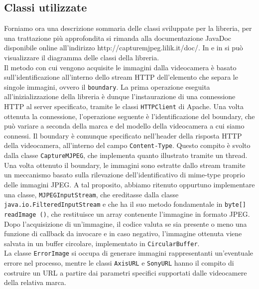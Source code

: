 \documentclass[a4paper,11pt]{article}
\begin{document}
\subsection{Classi utilizzate}
\label{sec:classi}
Forniamo ora una descrizione sommaria delle classi sviluppate per la
libreria, per una trattazione più approfondita si rimanda alla
documentazione JavaDoc disponibile online all'indirizzo 
http://capturemjpeg.lilik.it/doc/.
In  e in 
si pu\`o visualizzare il diagramma delle classi della libreria.\\
Il metodo con cui vengono acquisite le immagini dalla videocamera \`e basato
sull'identificazione all'interno dello stream HTTP dell'elemento che 
separa le singole immagini, ovvero il \texttt{boundary}.
La prima operazione eseguita all'inizializzazione della libreria \`e dunque 
l'instaurazione di una connessione HTTP al server specificato, tramite le
classi \texttt{HTTPClient} di Apache. Una volta ottenuta la connessione,
l'operazione seguente \`e l'identificazione del boundary, che pu\`o variare
a seconda della marca e del modello della videocamera a cui siamo connessi.
Il boundary \`e comunque specificato nell'header della risposta HTTP della
videocamera, all'interno del campo \texttt{Content-Type}. Questo compito
\`e svolto dalla classe \texttt{CaptureMJPEG}, che implementa quanto illustrato
tramite un thread.\\
Una volta ottenuto il boundary, le immagini sono estratte dallo stream tramite
un meccanismo basato sulla rilevazione dell'identificativo di mime-type
proprio delle immagini JPEG. A tal proposito, abbiamo ritenuto
oppurtuno implementare una classe, \texttt{MJPEGInputStream}, che ereditasse
dalla classe \texttt{java.io.FilteredInputStream} e che ha il suo metodo
fondamentale in \texttt{byte[] readImage ()}, che restituisce un array
contenente l'immagine in formato JPEG.\\
Dopo l'acquisizione di un'immagine, il codice valuta se sia presente o meno
una funzione di callback da invocare e in caso negativo, l'immagine
ottenuta viene salvata in un buffer circolare, implementato in 
\texttt{CircularBuffer}.\\
La classe \texttt{ErrorImage} si occupa di generare immagini rappresentanti
un'eventuale errore nel processo, mentre le classi \texttt{AxisURL} e 
\texttt{SonyURL} hanno il compito di costruire un URL a partire dai parametri
specifici supportati dalle videocamere della relativa marca.
\end{document}
